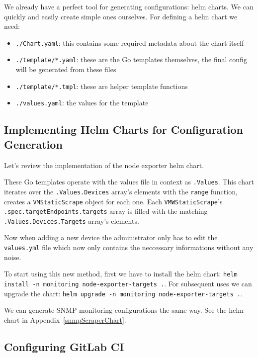 We already have a perfect tool for generating configurations: helm charts. We
can quickly and easily create simple ones ourselves. For defining a helm chart
we need:

\begin{itemize}
	\item \verb+./Chart.yaml+: this contains some required metadata about the chart itself
	\item \verb+./template/*.yaml+: these are the Go templates themselves, the final config will be generated from these files
	\item \verb+./template/*.tmpl+: these are helper template functions
	\item \verb+./values.yaml+: the values for the template
\end{itemize}

\subsection{Implementing Helm Charts for Configuration Generation}

Let's review the implementation of the node exporter helm chart.



These Go templates operate with the values file in context as \verb+.Values+.
This chart iterates over the \verb+.Values.Devices+ array's elements with the
\verb+range+ function, creates a \verb+VMStaticScrape+ object for each one.
Each \verb+VMWStaticScrape+'s \verb+.spec.targetEndpoints.targets+ array is
filled with the matching \verb+.Values.Devices.Targets+ array's elements.

Now when adding a new device the administrator only has to edit the
\verb+values.yml+ file which now only contains the neccessary informations
without any noise.

To start using this new method, first we have to install the helm chart:
\verb+helm install -n monitoring node-exporter-targets .+. For subsequent uses
we can upgrade the chart: \verb+helm upgrade -n monitoring node-exporter-targets .+.

We can generate SNMP monitoring configurations the same way. See the helm chart
in Appendix~\ref{snmpScraperChart}.

\subsection{Configuring GitLab CI}


